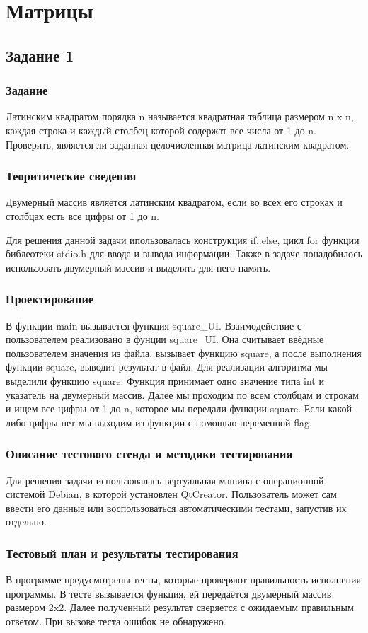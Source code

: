 \documentclass[12pt,a4paper]{report}
\begin{document}
\chapter{Матрицы}
\section{Задание 1}
\subsection{Задание}
Латинским квадратом порядка n называется квадратная таблица размером n x n, каждая строка и каждый столбец которой содержат все числа от 1 до n. Проверить, является ли заданная целочисленная матрица латинским квадратом.
\subsection{Теоритические сведения}
Двумерный массив является латинским квадратом, если во всех его строках и столбцах есть все цифры от 1 до n.

Для решения данной задачи ипользовалась конструкция if..else, цикл for функции библеотеки stdio.h для ввода и вывода информации. Также в задаче понадобилось использовать двумерный массив и выделять для него память.
\subsection{Проектирование}
В функции main вызывается функция square\_UI. Взаимодействие с пользователем реализовано в фунции square\_UI. Она считывает ввёдные пользователем значения из файла, вызывает функцию square, а после выполнения функции square, выводит результат в файл. Для реализации алгоритма мы выделили функцию square. Функция принимает одно значение типа int и указатель на двумерный массив. Далее мы проходим по всем столбцам и строкам и ищем все цифры от 1 до n, которое мы передали функции square. Если какой-либо цифры нет мы выходим из функции с помощью переменной flag. 
\subsection{Описание тестового стенда и методики тестирования}
Для решения задачи использовалась вертуальная машина с операционной системой Debian, в которой установлен QtCreator. 
Пользователь может сам ввести его данные или воспользоваться автоматическими тестами, запустив их отдельно.
\subsection{Тестовый план и результаты тестирования}
В программе предусмотрены тесты, которые проверяют правильность исполнения программы. В тесте вызывается функция, ей передаётся двумерный массив размером 2x2. Далее полученный результат сверяется с ожидаемым правильным ответом. При вызове теста ошибок не обнаружено.
\end{document}
